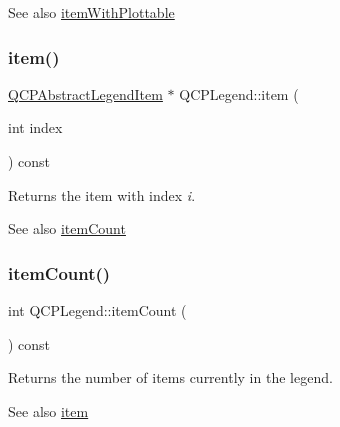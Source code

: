 \begin{DoxySeeAlso}{See also}
\mbox{\hyperlink{class_q_c_p_legend_a91e790002d8bf15a20628a8e8841e397}{item\+With\+Plottable}} 
\end{DoxySeeAlso}
\mbox{\label{class_q_c_p_legend_acfe9694c45104a3359d3806ed366fcf7}} 
\subsubsection{\texorpdfstring{item()}{item()}}
{\footnotesize\ttfamily \mbox{\hyperlink{class_q_c_p_abstract_legend_item}{Q\+C\+P\+Abstract\+Legend\+Item}} $\ast$ Q\+C\+P\+Legend\+::item (\begin{DoxyParamCaption}\item[{int}]{index }\end{DoxyParamCaption}) const}

Returns the item with index {\itshape i}.

\begin{DoxySeeAlso}{See also}
\mbox{\hyperlink{class_q_c_p_legend_a57ab86ab8b2a3762d4c1455eb5452c88}{item\+Count}} 
\end{DoxySeeAlso}
\mbox{\label{class_q_c_p_legend_a57ab86ab8b2a3762d4c1455eb5452c88}} 
\subsubsection{\texorpdfstring{item\+Count()}{itemCount()}}
{\footnotesize\ttfamily int Q\+C\+P\+Legend\+::item\+Count (\begin{DoxyParamCaption}{ }\end{DoxyParamCaption}) const}

Returns the number of items currently in the legend. \begin{DoxySeeAlso}{See also}
\mbox{\hyperlink{class_q_c_p_legend_acfe9694c45104a3359d3806ed366fcf7}{item}} 
\end{DoxySeeAlso}
\mbox{\label{class_q_c_p_legend_a91e790002d8bf15a20628a8e8841e397}} 
